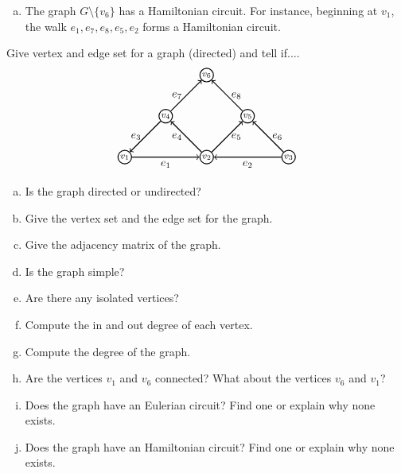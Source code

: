 \documentclass[11pt,letterpaper]{article}
\begin{document}
\begin{enumerate}[(a)]
\item The graph $G \setminus \{ v_6 \}$ has a Hamiltonian circuit. For instance, beginning at $v_1$, the walk $e_1, e_7, e_8, e_5, e_2$ forms a Hamiltonian circuit. 
\end{enumerate}





\newpage





 Give vertex and edge set for a graph (directed) and tell if....
	\[
	\graphTwo
	\]

\begin{enumerate}[(a)]
\item Is the graph directed or undirected?
\item Give the vertex set and the edge set for the graph.
\item Give the adjacency matrix of the graph.
\item Is the graph simple?
\item Are there any isolated vertices?
\item Compute the in and out degree of each vertex. 
\item Compute the degree of the graph.
\item Are the vertices $v_1$ and $v_6$ connected? What about the vertices $v_6$ and $v_1$? 
\item Does the graph have an Eulerian circuit? Find one or explain why none exists.  
\item Does the graph have an Hamiltonian circuit? Find one or explain why none exists.  
\end{enumerate} \pspace
\end{document}
